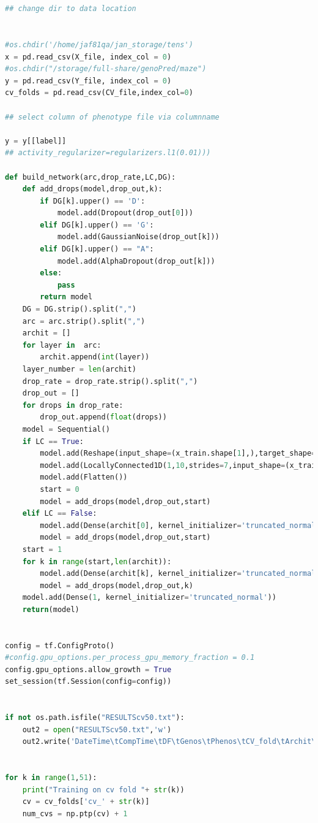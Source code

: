 \begin{lstlisting}[language=Python]
        
        
## change dir to data location


#os.chdir('/home/jaf81qa/jan_storage/tens')
x = pd.read_csv(X_file, index_col = 0)
#os.chdir("/storage/full-share/genoPred/maze")
y = pd.read_csv(Y_file, index_col = 0)
cv_folds = pd.read_csv(CV_file,index_col=0)

## select column of phenotype file via columnname

y = y[[label]]
## activity_regularizer=regularizers.l1(0.01)))

def build_network(arc,drop_rate,LC,DG):
    def add_drops(model,drop_out,k):
        if DG[k].upper() == 'D':
            model.add(Dropout(drop_out[0]))
        elif DG[k].upper() == 'G':
            model.add(GaussianNoise(drop_out[k]))
        elif DG[k].upper() == "A":
            model.add(AlphaDropout(drop_out[k]))
        else:
            pass
        return model    
    DG = DG.strip().split(",")
    arc = arc.strip().split(",")
    archit = []
    for layer in  arc:
        archit.append(int(layer))
    layer_number = len(archit)        
    drop_rate = drop_rate.strip().split(",")
    drop_out = []
    for drops in drop_rate:
        drop_out.append(float(drops)) 
    model = Sequential()
    if LC == True:
        model.add(Reshape(input_shape=(x_train.shape[1],),target_shape=(x_train.shape[1],1)))
        model.add(LocallyConnected1D(1,10,strides=7,input_shape=(x_train.shape[1],1)))
        model.add(Flatten())
        start = 0
        model = add_drops(model,drop_out,start)
    elif LC == False:
        model.add(Dense(archit[0], kernel_initializer='truncated_normal', activation=act, input_shape=(x_train.shape[1],)))
        model = add_drops(model,drop_out,start)
    start = 1
    for k in range(start,len(archit)):
        model.add(Dense(archit[k], kernel_initializer='truncated_normal', activation=act))
        model = add_drops(model,drop_out,k)
    model.add(Dense(1, kernel_initializer='truncated_normal'))
    return(model)

     
config = tf.ConfigProto()
#config.gpu_options.per_process_gpu_memory_fraction = 0.1
config.gpu_options.allow_growth = True
set_session(tf.Session(config=config))


if not os.path.isfile("RESULTScv50.txt"):
    out2 = open("RESULTScv50.txt",'w')
    out2.write('DateTime\tCompTime\tDF\tGenos\tPhenos\tCV_fold\tArchit\tConv\tActFun\tEpochs\tdrop_rate\tAccuracy\n' )

    
for k in range(1,51):
    print("Training on cv fold "+ str(k))
    cv = cv_folds['cv_' + str(k)]
    num_cvs = np.ptp(cv) + 1
    

\end{lstlisting}
